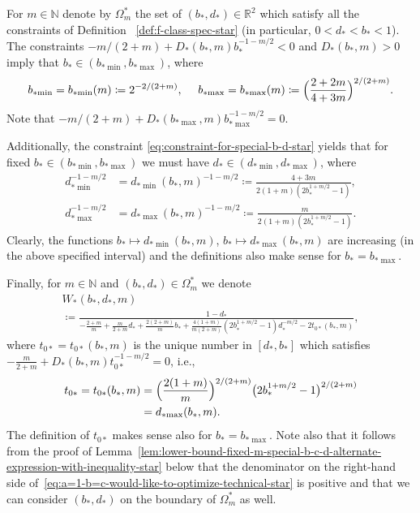 \documentclass[a4paper]{amsart} %
\theoremstyle{definition}
\theoremstyle{remark}
\numberwithin{equation}{section}
\newcommand*{\RR}{\mathbb{R}}
\newcommand*{\NN}{\mathbb{N}}
\newcommand*{\bStar}{b_*}
\newcommand*{\dStar}{d_*}
\newcommand*{\dOneStar}{D_*}%
\newcommand*{\tZeroStar}{t_{0*}}
\newcommand*{\specialbdStar}[1]{\Omega_{#1}^*}
\newcommand*{\XXXspecialbdStar}{W_*}
\newcommand*{\bMinStar}{b_{*\!\min}}
\newcommand*{\bMaxStar}{b_{*\!\max}}
\newcommand*{\dMinStar}{d_{*\!\min}}
\newcommand*{\dMaxStar}{d_{*\!\max}}
\begin{document}
For $m\in\NN$ denote by $\specialbdStar{m}$
the set of $(\bStar,\dStar)\in\RR^2$ which satisfy all the constraints 
of Definition ~\ref{def:f-class-spec-star} (in particular, $0< \dStar < \bStar < 1$).
The constraints 
$-m/(2+m) + \dOneStar(\bStar,m) \bStar^{-1-m/2} <0$ and $\dOneStar(\bStar,m) >0$
imply that $\bStar\in (\bMinStar, \bMaxStar)$, where
\begin{equation}
\label{eq:def-bMin-bMax-star}
\bMinStar = \bMinStar(m)\coloneqq 2^{-2/(2+m)},
\quad \ %
\bMaxStar = \bMaxStar(m) \coloneqq \Bigl(\frac{2+2m}{4+3m}\Bigr)^{2/(2+m)}.
\end{equation}
Note that 
$-m/(2+m) + \dOneStar(\bMaxStar,m) \bMaxStar^{-1-m/2} = 0$.


Additionally, the constraint \eqref{eq:constraint-for-special-b-d-star} yields
that for fixed $\bStar\in (\bMinStar, \bMaxStar)$ we must have
$\dStar\in (\dMinStar, \dMaxStar)$,
where
\begin{align}
\label{eq:def-dMin-star} 
\dMinStar ^{-1-m/2} &= \dMinStar(\bStar,m)^{-1-m/2} 
\coloneqq \frac{4+3m}{ 2(1+m) (2\bStar^{1+m/2}  -1)},\\
\label{eq:def-dMax-star} 
\dMaxStar^{-1-m/2} &= \dMaxStar(\bStar,m)^{-1-m/2} \coloneqq \frac{m}{ 2(1+m) (2\bStar^{1+m/2}  -1)}.
\end{align}
Clearly, the functions
$\bStar\mapsto \dMinStar(\bStar,m)$,
$\bStar\mapsto \dMaxStar(\bStar,m)$
are increasing (in the above specified interval)
and the definitions also make sense for $\bStar = \bMaxStar$.


Finally, for $m\in\NN$ and $(\bStar,\dStar)\in\specialbdStar{m}$ 
we denote
\begin{multline}
\label{eq:a=1-b=c-would-like-to-optimize-technical-star}
\XXXspecialbdStar(\bStar,\dStar,m)\\
\coloneqq 
\frac{1-\dStar}{-\frac{2+m}{m}  + \frac{m}{2+m}\dStar + \frac{2(2+m)}{m}\bStar +
	\frac{4(1+m)}{m(2+m)}(2\bStar^{1+m/2}  -1)\dStar^{-m/2} 
	- 2\tZeroStar(\bStar,m)},
\end{multline}
where  $\tZeroStar  = \tZeroStar (\bStar,m)$ is  
the unique number in $[\dStar,\bStar]$  which satisfies
$-\frac{m}{2+m} + \dOneStar(\bStar,m) \tZeroStar ^{-1-m/2} = 0$,
i.e.,
\begin{align}
\label{eq:def-t_0-explicit-formula-star}
\tZeroStar =  \tZeroStar(\bStar,m) 
&= \Bigl(\frac{2(1+m)}{m}\Bigr)^{2/(2+m)} \bigl(2 \bStar^{1+m/2} -1\bigr)^{2/(2+m)}\\
& = \dMaxStar(\bStar,m). \nonumber
\end{align}
The definition of $\tZeroStar$ makes sense also for $\bStar=\bMaxStar$.
Note also that it follows from the proof of Lemma~\ref{lem:lower-bound-fixed-m-special-b-c-d-alternate-expression-with-inequality-star}
below that the denominator on the right-hand side of~\eqref{eq:a=1-b=c-would-like-to-optimize-technical-star} is positive and that we can consider $(\bStar,\dStar)$ on the boundary of $\specialbdStar{m}$ as well.
\end{document}
